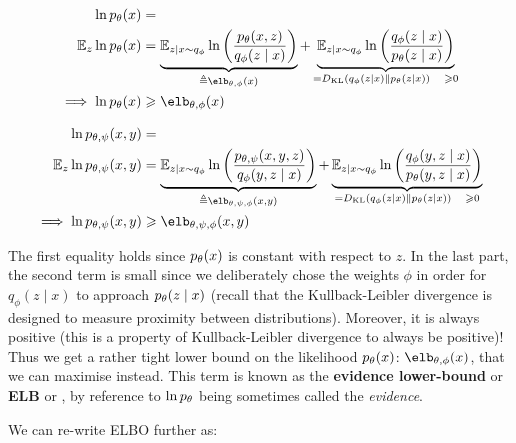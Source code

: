 \documentclass{article}
\begin{document}
\begin{appendix}
\textcolor{blue}{
$$
\begin{aligned}
\ln \pt(x) & = \\
\esp_z \ln \pt(x) & =
\underbrace{
    \esp_{z|x\sim q_\phi} \ln \left( \frac{ \pt(x,z) }{ \qp(z \mid x) } \right)
}_{
    \triangleq \elb_{\theta, \phi}(x)
}
+ \underbrace{
    \esp_{z|x \sim q_\phi} \ln \left( \frac{ \qp(z \mid x) }{ \pt(z \mid x) } \right)
}_{
    = \KL ( q_{\phi}(z \mid x) \| \pt (z \mid x) ) \quad \geqslant 0
} \\
\implies \ln \pt(x) & \geqslant \elb_{\theta, \phi}(x)
\end{aligned}
$$
}

$$
\begin{aligned}
\ln \ptp(x,y) & = \\
\esp_z \ln \ptp(x,y) & =
\underbrace{
    \esp_{z|x\sim q_\phi} \ln \left( \frac{ \ptp(x,y,z) }{ \qp(y, z \mid x) } \right)
}_{
    \triangleq \elb_{\theta, \psi, \phi}(x,y)
}
+ \underbrace{
    \esp_{z|x \sim q_\phi} \ln \left( \frac{ \qp(y, z \mid x) }{ \pt(y, z \mid x) } \right)
}_{
    = \KL ( q_{\phi}(z \mid x) \| \pt (z \mid x) ) \quad \geqslant 0
} \\
\implies \ln \ptp(x,y) & \geqslant \elb_{\theta, \psi, \phi}(x,y)
\end{aligned}
$$

The first equality holds since $p_\theta(x)$ is constant with respect to $z$. In the last part, the second term is small since we deliberately chose the weights $\phi$ in order for $q_{\phi}(z \mid x)$ to approach $p_\theta (z \mid x)$ (recall that the Kullback-Leibler divergence is designed to measure proximity between distributions). Moreover, it is always positive (this is a property of Kullback-Leibler divergence to always be positive)! Thus we get a rather tight lower bound on the likelihood $p_\theta(x)$: $\elb_{\theta, \phi}(x)$, that we can maximise instead. This term is known as the \textbf{evidence lower-bound} or \textbf{ELB} or , by reference to $\ln p_\theta$ being sometimes called the \textit{evidence}.

We can re-write ELBO further as:

\begin{comment}
\end{comment}


\end{appendix}
\end{document}
